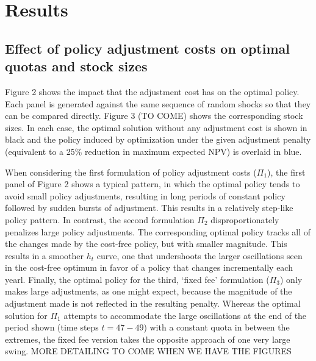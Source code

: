 \documentclass{article}\usepackage[]{graphicx}\usepackage[]{color}
\begin{document}
\section{Results}
\subsection*{Effect of policy adjustment costs on optimal quotas and stock sizes}
Figure 2 shows the impact that the adjustment cost has on the optimal policy.   Each panel is generated against the same sequence of random shocks so that they can be compared directly. Figure 3 (TO COME) shows the corresponding stock sizes.  In each case, the optimal solution without any adjustment cost is shown in black and the policy induced by optimization under the given adjustment penalty (equivalent to a 25\% reduction in maximum expected NPV) is overlaid in blue.  

When considering the first formulation of policy adjustment costs ($\Pi_1$), the first  panel of Figure 2 shows a typical pattern, in which the optimal policy tends to avoid small policy adjustments, resulting in long periods of constant policy followed by sudden bursts of adjustment. This results in a relatively step-like policy pattern.  In contrast, the second formulation $\Pi_2$ disproportionately penalizes large policy adjustments. The corresponding optimal policy tracks all of the changes made by the cost-free policy, but with smaller magnitude.  This results in a smoother $h_t$ curve, one that undershoots the larger oscillations seen in the cost-free optimum in favor of a policy that changes incrementally each yearl.  Finally, the optimal policy for the third, `fixed fee' formulation ($\Pi_3$) only makes large adjustments, as one might expect, because the magnitude of the adjustment made is not reflected in the resulting penalty.  Whereas the optimal solution for $\Pi_1$ attempts to accommodate the large oscillations at the end of the period shown (time steps $t=47-49$) with a constant quota in between the extremes, the fixed fee version takes the opposite approach of one very large swing. MORE DETAILING TO COME WHEN WE HAVE THE FIGURES
\end{document}
